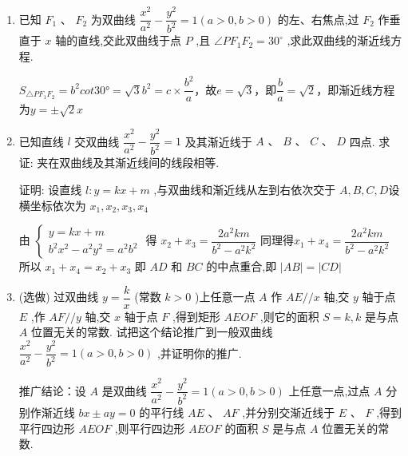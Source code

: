 \begin{enumerate}
\begin{jieda}
        故巨响发生在接报中心的西偏北 ${45}^{ \circ  }$ 距中心 ${340}\sqrt{3}{m}$ 处.
    \end{jieda} 

    \item 已知 ${F}_{1}\text{ 、 }{F}_{2}$ 为双曲线 $\dfrac{{x}^{2}}{{a}^{2}} - \dfrac{{y}^{2}}{{b}^{2}} = 1\left( {a > 0,b > 0}\right)$ 的左、右焦点,过 ${F}_{2}$ 作垂直于 $x$ 轴的直线,交此双曲线于点 $P$ ,且 $\angle P{F}_{1}{F}_{2} = {30}^{ \circ  }$ ,求此双曲线的渐近线方程.
    \begin{jieda}
        $S_{\triangle PF_1F_2} = b^2cot\ang{30} = \sqrt{3}b^2 = c \times \dfrac{b^2}{a}$，故$e = \sqrt{3}$，即$\dfrac{b}{a} = \sqrt{2}$，即渐近线方程为$y = \pm \sqrt{2}x$
    \end{jieda}

    \item 已知直线 $l$ 交双曲线 $\dfrac{{x}^{2}}{{a}^{2}} - \dfrac{{y}^{2}}{{b}^{2}} = 1$ 及其渐近线于 $A\text{ 、 }B\text{ 、 }C\text{ 、 }D$ 四点. 求证: 夹在双曲线及其渐近线间的线段相等.
    \begin{jieda}
        证明: 设直线 $l : y = {kx} + m$ ,与双曲线和渐近线从左到右依次交于 ${A},{B},{C},{D}$设横坐标依次为 ${x}_{1},{x}_{2},{x}_{3},{x}_{4}$ 
        
        由 $\left\{  {\begin{matrix} y = {kx} + m \\  {b}^{2}{x}^{2} - {a}^{2}{y}^{2} = {a}^{2}{b}^{2} \end{matrix}\text{ 得 }{x}_{2} + {x}_{3} = \dfrac{2{a}^{2}{km}}{{b}^{2} - {a}^{2}{k}^{2}}}\right.$
        同理得${x}_{1} + {x}_{4} = \dfrac{2{a}^{2}{km}}{{b}^{2} - {a}^{2}{k}^{2}}$
        所以 ${x}_{1} + {x}_{4} = {x}_{2} + {x}_{3}$
        即 ${{AD}}$ 和 ${{BC}}$ 的中点重合,即 $\left| {AB}\right|  = \left| {CD}\right|$
    \end{jieda}

    \item (选做) 过双曲线 $y = \dfrac{k}{x}$ (常数 $k > 0$ )上任意一点 $A$ 作 ${AE}//x$ 轴,交 $y$ 轴于点 $E$ ,作 ${AF}//y$ 轴,交 $x$ 轴于点 $F$ ,得到矩形 ${AEOF}$ ,则它的面积 $S = k,k$ 是与点 $A$ 位置无关的常数. 试把这个结论推广到一般双曲线 $\dfrac{{x}^{2}}{{a}^{2}} - \dfrac{{y}^{2}}{{b}^{2}} = 1\left( {a > 0,b > 0}\right)$ ,并证明你的推广.
    \begin{jieda}
        推广结论：设 $A$ 是双曲线 $\dfrac{{x}^{2}}{{a}^{2}} - \dfrac{{y}^{2}}{{b}^{2}} = 1\left( {a > 0,b > 0}\right)$ 上任意一点,过点 $A$ 分别作渐近线 ${bx} \pm  {ay} = 0$ 的平行线 ${AE}$ 、 ${AF}$ ,并分别交渐近线于 $E$ 、 $F$ ,得到平行四边形 ${AEOF}$ ,则平行四边形 ${AEOF}$ 的面积 $S$ 是与点 $A$ 位置无关的常数.
    

\end{jieda}
\end{enumerate}
